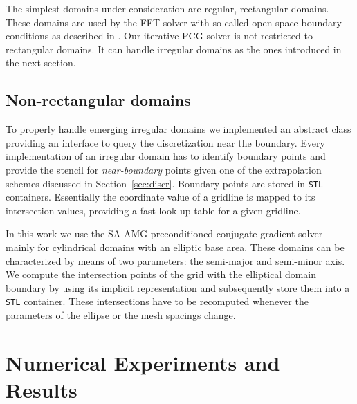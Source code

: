 \documentclass[a4paper,10pt,3p,final,pdftex]{elsarticle}
\begin{document}
The simplest domains under consideration are regular, rectangular
domains.  These domains are used by the FFT solver with so-called
open-space boundary conditions as described in \cite{hoea:88}. 
Our iterative PCG solver is not restricted to rectangular domains.  It
can handle irregular domains as the ones introduced in the next section.

\subsection*{Non-rectangular domains}

To properly handle emerging irregular domains we implemented an abstract
class providing an interface to query the discretization near the
boundary.  Every implementation of an irregular domain has to identify
boundary points and provide the stencil for \textit{near-boundary}
points given one of the extrapolation schemes discussed in
Section~\ref{sec:discr}.  Boundary points are stored in \texttt{STL}
containers. Essentially the coordinate value of a gridline is mapped to
its intersection values, providing a fast look-up table for a given
gridline.

In this work we use the SA-AMG preconditioned conjugate gradient solver
mainly for cylindrical domains with an elliptic base area.  These
domains can be characterized by means of two parameters: the semi-major
and semi-minor axis.  We compute the intersection points of the grid
with the elliptical domain boundary by using its implicit representation
and subsequently store them into a \texttt{STL} container.  These
intersections have to be recomputed whenever the parameters of the
ellipse or the mesh spacings change.

\section{Numerical Experiments and Results}
\label{sec:results}
\end{document}
